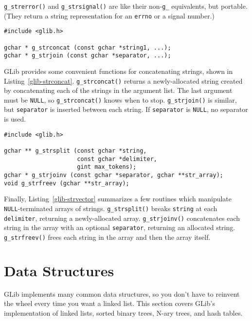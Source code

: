 \lstinline{g_strerror()} and \lstinline{g_strsignal()} are like their non-\lstinline{g_} equivalents, but portable. (They return a string representation for an \lstinline{errno} or a signal number.)

\begin{lstlisting}[float, caption={Concatenating Strings}, label=glib-strconcat]
#include <glib.h>

gchar * g_strconcat (const gchar *string1, ...);
gchar * g_strjoin (const gchar *separator, ...);
\end{lstlisting}

GLib provides some convenient functions for concatenating strings, shown in Listing~\ref{glib-strconcat}. \lstinline{g_strconcat()} returns a newly-allocated string created by concatenating each of the strings in the argument list. The last argument must be \lstinline{NULL}, so \lstinline{g_strconcat()} knows when to stop. \lstinline{g_strjoin()} is similar, but \lstinline{separator} is inserted between each string. If \lstinline{separator} is \lstinline{NULL}, no separator is used.

\begin{lstlisting}[float, caption={Manipulating \lstinline{NULL}-terminated string vectors}, label=glib-strvector]
#include <glib.h>

gchar ** g_strsplit (const gchar *string,
                     const gchar *delimiter,
                     gint max_tokens);
gchar * g_strjoinv (const gchar *separator, gchar **str_array);
void g_strfreev (gchar **str_array);
\end{lstlisting}

Finally, Listing~\ref{glib-strvector} summarizes a few routines which manipulate \lstinline{NULL}-terminated arrays of strings. \lstinline{g_strsplit()} breaks \lstinline{string} at each \lstinline{delimiter}, returning a newly-allocated array. \lstinline{g_strjoinv()} concatenates each string in the array with an optional \lstinline{separator}, returning an allocated string. \lstinline{g_strfreev()} frees each string in the array and then the array itself.

\section{Data Structures}

GLib implements many common data structures, so you don't have to reinvent the wheel every time you want a linked list. This section covers GLib's implementation of linked lists, sorted binary trees, N-ary trees, and hash tables.

